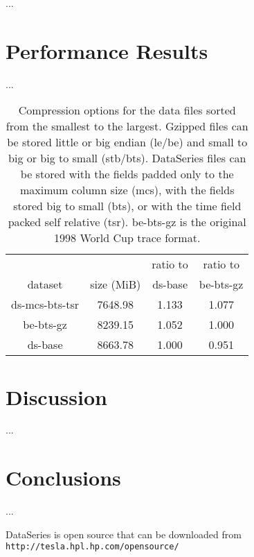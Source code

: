 \documentclass{acm_proc_article-sp}
\begin{document}
...

\section{Performance Results}\label{sec:results}

...

\begin{table}
\centering
\begin{tabular}{|c|c|c|c|}\hline

               &            & ratio to & ratio to \\
    dataset    & size (MiB) & ds-base & be-bts-gz \\
\hline							   
ds-mcs-bts-tsr & 7648.98  & 1.133         & 1.077         \\
be-bts-gz      & 8239.15  & 1.052         & 1.000         \\
ds-base        & 8663.78  & 1.000         & 0.951         \\
\hline
\hline
\end{tabular}

\caption{Compression options for the data files sorted from the smallest 
to the largest.  Gzipped files can be stored little or big endian
(le/be) and small to big or big to small (stb/bts).  DataSeries files
can be stored with the fields padded only to the maximum column size
(mcs), with the fields stored big to small (bts), or with the time
field packed self relative (tsr). be-bts-gz is the original 1998 World
Cup trace format.}

\label{table:wc1998:compression}
\end{table}

\section{Discussion}\label{sec:discussion}

...

\section{Conclusions}\label{sec:conclusions}

...

DataSeries is open source that can be downloaded from {\tt
http://tesla.hpl.hp.com/opensource/}


{\small

}
%
%
\balancecolumns
\end{document}
